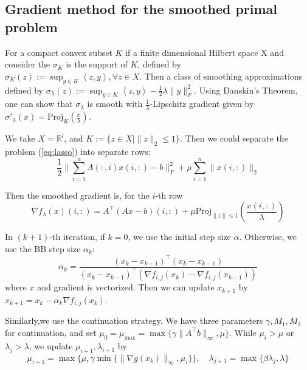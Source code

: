 \documentclass{article}
\numberwithin{equation}{section}
\numberwithin{figure}{section}
\begin{document}
\subsection{Gradient method for the smoothed primal problem}
For a compact convex subset $K$ if a finite dimensional Hilbert space X and consider the $\sigma_K$ is the support of $K$, defined by $\sigma_K(z):=\sup_{y\in K}\left<z,y\right>,\forall z\in X$. Then a class of smoothing approximations defined by $\sigma_\lambda(z) :=\sup_{y\in K}\left<z,y\right> - \frac{1}{2}\lambda \|y\|_F^2$. Using Danskin's Theorem, one can show that $\sigma_\lambda$ is smooth with $\frac{1}{\lambda}$-Lipschitz gradient given by $\sigma'_\lambda(x) = \mathrm{Proj}_K(\frac{x}{\lambda})$.

We take $X=\mathbb{R}^{l}$, and $K:=\{z\in X| \|z\|_{2}\leq 1\}$. Then we could separate the problem (\ref{eq:lasso}) into separate rows:
\begin{equation}
    \frac{1}{2}\|\sum_{i=1}^n A(:,i)x(i,:)-b\|_F^2+\mu \sum_{i=1}^n \|x(i,:)\|_2
\end{equation}

Then the smoothed gradient is, for the $i$-th row
\begin{equation}
    \nabla f_\lambda(x) (i,:) = A^\top (Ax-b)(i,:)+\mu \mathrm{Proj}_{\|z\|\leq 1}(\frac{x(i,:)}{\lambda})
\end{equation}

In $(k+1)$-th iteration, if $k=0$, we use the initial step size $\alpha$. Otherwise, we use the BB step size $\alpha_k$:
\begin{equation}
    \alpha_k = \frac{(x_k-x_{k-1})^\top (x_k-x_{k-1})}{(x_k-x_{k-1})^\top(\nabla f_{i,j}(x_k)-\nabla f_{i,j}(x_{k-1}))} \label{eq:bb1}
\end{equation}
where $x$ and gradient is vectorized. Then we can update $x_{k+1}$ by $x_{k+1}=x_k-\alpha_k\nabla f_{i,j}(x_k)$.

Similarly,we use the continuation strategy. We have three parameters $\gamma, M_1,M_2$ for continuation, and set $\mu_0=\mu_{\max}=\max\{\gamma\|A^\top b\|_\infty,\mu\}$. While $\mu_i>\mu$ or $\lambda_j>\lambda$, we update $\mu_{i+1},\lambda_{i+1}$ by
\begin{equation}
\mu_{i+1}=\max\{\mu, \gamma\min\{\|\nabla g(x_k)\|_\infty, \mu_i\} \}, \quad \lambda_{j+1}=\max\{\beta\lambda_j,\lambda\}
\end{equation}
\end{document}
